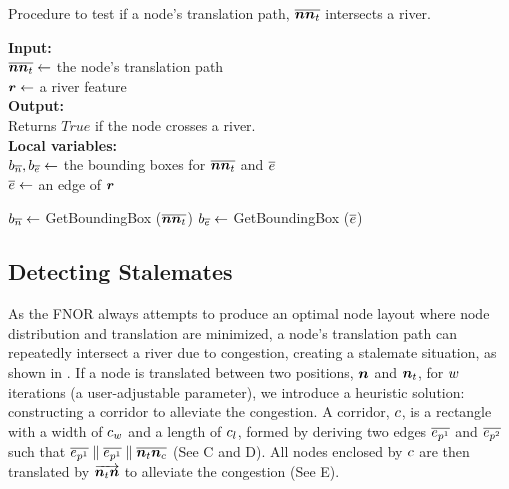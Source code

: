 \begin{algorithm}[tb!]
    \caption{Procedure to test if a node's translation path, $ \protect\overline{\bm{n}\bm{n}_t} $ intersects a river.}\label{alg:check river intersection}
    \textbf{Input:} \\
    $ \protect\overline{\bm{n}\bm{n}_t} \gets $ the node's translation path \\
    $ \bm{r} \gets $ a river feature \\

    \textbf{Output:} \\
    Returns $ True $ if the node crosses a river. \\

    \textbf{Local variables:} \\
    $ b_{\protect\overline{n}}, b_{\protect\overline{e}} \gets $ the bounding boxes for $ \protect\overline{\bm{n}\bm{n}_t} $ and $ \protect\overline{e} $ \\
    $ \protect\overline{e} \gets $ an edge of $ \bm{r} $ \\

    \begin{algorithmic}[1]
        
        \ForEach{$ \Edge \in \river $}
            \State $ b_{\protect\overline{n}} \gets $ GetBoundingBox ($ \protect\overline{\bm{n}\bm{n}_t} $)
            \State $ b_{\protect\overline{e}} \gets $ GetBoundingBox ($ \protect\overline{e} $)

                \State {}
                \EndIf
        \EndFor
        
        \State {}
        \EndProcedure
    \end{algorithmic}
\end{algorithm}

\subsection{Detecting Stalemates}

As the FNOR always attempts to produce an optimal node layout where node distribution and translation are minimized, a node's translation path can repeatedly intersect a river due to congestion, creating a stalemate situation, as shown in . If a node is translated between two positions, $ \bm{n} $ and $ \bm{n}_t $, for $ w $ iterations (a user-adjustable parameter), we introduce a heuristic solution: constructing a corridor to alleviate the congestion. A corridor, $ c $, is a rectangle with a width of $ c_w $ and a length of $ c_l $, formed by deriving two edges $ \protect\overline{e_{p^1}} $ and $ \protect\overline{e_{p^2}} $ such that $ \protect\overline{e_{p^1}} \parallel \protect\overline{e_{p^1}} \parallel \protect\overline{\bm{n}_t\bm{n}_c} $ (See C and D). All nodes enclosed by $ c $ are then translated by $ \protect\overrightarrow{\bm{n}_t\bm{n}} $ to alleviate the congestion (See E).

